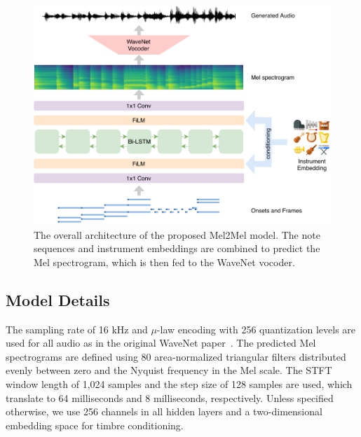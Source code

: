 \begin{figure}[t]
	\centering
	\includegraphics[width=\linewidth]{architecture.pdf}
	\caption{The overall architecture of the proposed Mel2Mel model. The note sequences and instrument embeddings are combined to predict the Mel spectrogram, which is then fed to the WaveNet vocoder.}
	\label{fig:mel2mel-architecture}
\end{figure}

\subsection{Model Details}

The sampling rate of 16 kHz and $\mu$-law encoding with 256 quantization levels are used for all audio as in the original WaveNet paper~\cite{oord2016wavenet}.
The predicted Mel spectrograms are defined using 80 area-normalized triangular filters distributed evenly between zero and the Nyquist frequency in the Mel scale.
The STFT window length of 1,024 samples and the step size of 128 samples are used, which translate to 64 milliseconds and 8 milliseconds, respectively.
Unless specified otherwise, we use 256 channels in all hidden layers and a two-dimensional embedding space for timbre conditioning.

